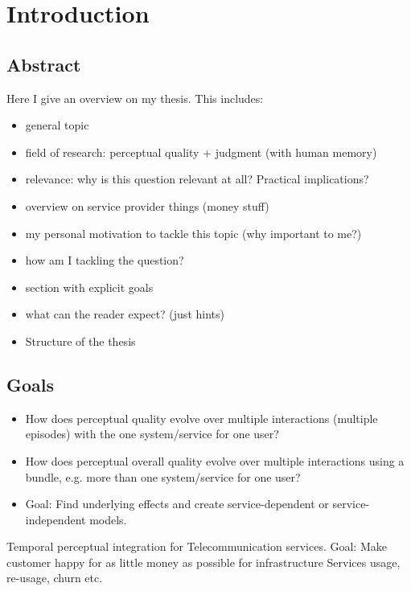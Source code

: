 \chapter{Introduction}
\section*{Abstract}
Here I give an overview on my thesis.
This includes:
\begin{itemize}
\item general topic
\item field of research: perceptual quality + judgment (with human memory)
\item relevance: why is this question relevant at all? Practical implications?
\item overview on service provider things (money stuff)
\item my personal motivation to tackle this topic (why important to me?)
\item how am I tackling the question?
\item section with explicit goals
\item what can the reader expect? (just hints)
\item Structure of the thesis
\end{itemize}

\section{Goals}
\begin{itemize}
\item How does perceptual quality evolve over multiple interactions (multiple episodes) with the one system/service for one user?
\item How does perceptual overall quality evolve over multiple interactions using a bundle, e.g. more than one system/service for one user?
\item Goal: Find underlying effects and create service-dependent or service-independent models.
\end{itemize}

Temporal perceptual integration for Telecommunication services.
		Goal: Make customer happy for as little money as possible for infrastructure
		Services usage, re-usage, churn etc.

